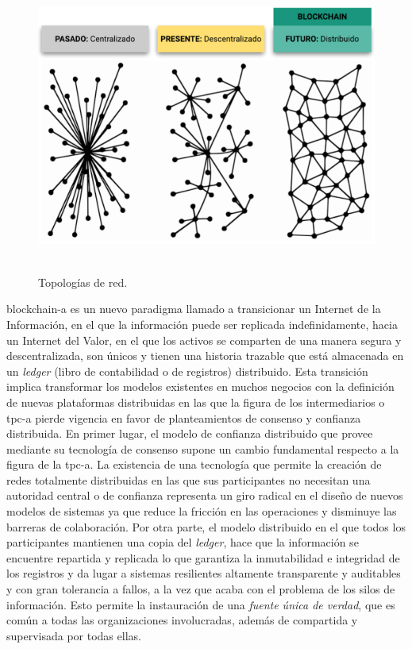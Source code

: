 \documentclass[12pt,a4paper, twoside]{report}
\begin{document}
	\begin{figure}[!ht]   
		\caption{Topologías de red.} 
		\begin{center} 
			\includegraphics[width=15cm,height=9cm]{Images/stateArt/intro} \\
			\label{fig:stateArt_intro} 
		\end{center}  
	\end{figure}
	
	\gls{blockchain-a} es un nuevo paradigma llamado a transicionar un Internet de la Información, en el que la información puede ser replicada indefinidamente, hacia un Internet del Valor, en el que los activos se comparten de una manera segura y descentralizada, son únicos y tienen una historia trazable que está almacenada en un \textit{ledger} (libro de contabilidad o de registros) distribuido. Esta transición implica transformar los modelos existentes en muchos negocios con la definición de nuevas plataformas distribuidas en las que la figura de los intermediarios o \gls{tpc-a} pierde vigencia en favor de planteamientos de consenso y confianza distribuida. En primer lugar, el modelo de confianza distribuido que provee mediante su tecnología de consenso supone un cambio fundamental respecto a la figura de la \gls{tpc-a}. La existencia de una tecnología que permite la creación de redes totalmente distribuidas en las que sus participantes no necesitan una autoridad central o de confianza representa un giro radical en el diseño de nuevos modelos de sistemas ya que reduce la fricción en las operaciones y disminuye las barreras de colaboración. Por otra parte, el modelo distribuido en el que todos los participantes mantienen una copia del \textit{ledger}, hace que la información se encuentre repartida y replicada lo que garantiza la inmutabilidad e integridad de los registros y da lugar a sistemas resilientes altamente transparente y auditables y con gran tolerancia a fallos, a la vez que acaba con el problema de los silos de información. Esto permite la instauración de una \textit{fuente única de verdad}, que es común a todas las organizaciones involucradas, además de compartida y supervisada por todas ellas. \\
	
\end{document}

